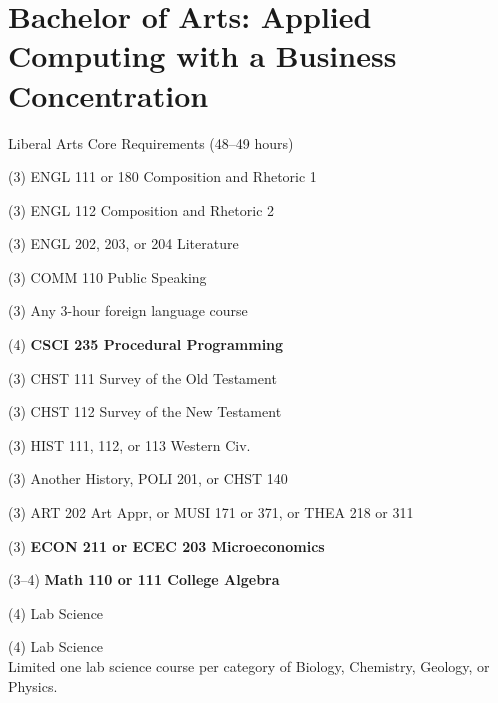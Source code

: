 %
\section*{Bachelor of Arts: Applied Computing with a Business Concentration}

\begin{reqgroup}{Liberal Arts Core Requirements (48--49 hours)}
\begin{checklist}
\begin{minipage}[t]{0.5\linewidth}
	\item (3) ENGL 111 or 180 Composition and Rhetoric 1
	\item (3) ENGL 112 Composition and Rhetoric 2
	\item (3) ENGL 202, 203, or 204 Literature
	\item (3) COMM 110 Public Speaking
	\item (3) Any 3-hour foreign language course
	\item (4) \textbf{CSCI 235  Procedural Programming}
	\item (3) CHST 111  Survey of the Old Testament
	\item (3) CHST 112  Survey of the New Testament
	\item (3) HIST 111, 112, or 113 Western Civ.
\end{minipage}
\begin{minipage}[t]{0.5\linewidth}
	\item (3)	Another History, POLI 201, or CHST 140
	\item (3)	ART 202 Art Appr, or MUSI 171 or 371, or THEA 218 or 311
	\item (3)	\textbf{ECON 211 or ECEC 203 Microeconomics}
	\item (3--4)	\textbf{Math 110 or 111 College Algebra}
	\item (4)	Lab Science
	\item (4)	Lab Science\\Limited one lab science course per category of Biology, Chemistry,
Geology, or Physics.
\end{minipage}
\end{checklist}
\end{reqgroup}


